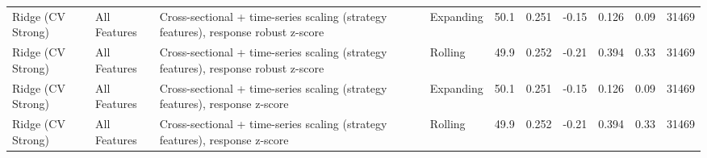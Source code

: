 \begin{tabular}{llllrrrrrr}
Ridge (CV Strong) & All Features & Cross-sectional + time-series scaling (strategy features), response robust z-score & Expanding & 50.1 & 0.251 & -0.15 & 0.126 & 0.09 & 31469 \\
Ridge (CV Strong) & All Features & Cross-sectional + time-series scaling (strategy features), response robust z-score & Rolling & 49.9 & 0.252 & -0.21 & 0.394 & 0.33 & 31469 \\
Ridge (CV Strong) & All Features & Cross-sectional + time-series scaling (strategy features), response z-score & Expanding & 50.1 & 0.251 & -0.15 & 0.126 & 0.09 & 31469 \\
Ridge (CV Strong) & All Features & Cross-sectional + time-series scaling (strategy features), response z-score & Rolling & 49.9 & 0.252 & -0.21 & 0.394 & 0.33 & 31469 \\
\bottomrule
\end{tabular}
